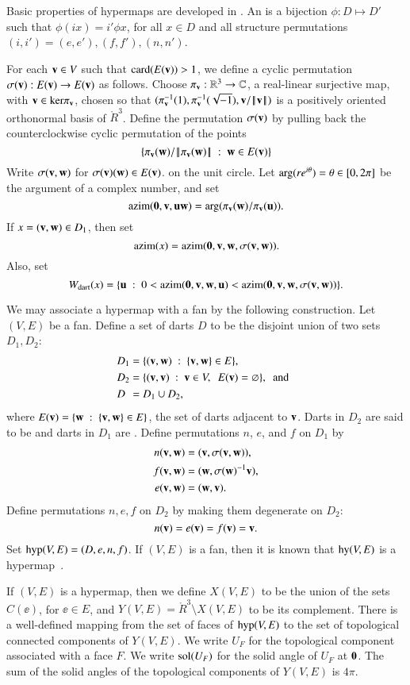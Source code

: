 \documentclass{llncs}
\def\op#1{{\hbox{#1}}}
\begin{document}
Basic properties of hypermaps are developed in \cite[Ch.~4]{DSP}.  An
 is a bijection $\phi:D\mapsto D'$
such that $\phi(i x) = i'\phi x$, for all $x\in D$ and all structure
permutations $(i,i')=(e,e'),(f,f'),(n,n')$.


For each ${\mathbf v}\in V$ such that $\card(E(\v))>1$, we define a cyclic
permutation $\sigma({\mathbf v}):E({\mathbf v})\to E({\mathbf v})$ as follows.  Choose
$\pi_{\mathbf v}:\mathbb{R}^3\to\mathbb{C}$, a real-linear surjective map, with
$\v\in \op{ker}\pi_\v$, chosen so that
$(\pi^{-1}_{\mathbf v}(1),\pi^{-1}_{\mathbf v}(\sqrt{-1}),{\mathbf v}/{\hbox{\ensuremath{\hspace{0.1em}|\hspace{-0.1em}|\hspace{0.1em}}}{\mathbf v}\hbox{\ensuremath{\hspace{0.1em}|\hspace{-0.1em}|\hspace{0.1em}}}})$ is a
positively oriented orthonormal basis of $\ring{R}^3$.  Define the
permutation $\sigma({\mathbf v})$ by pulling back the counterclockwise cyclic
permutation of the points
\[
\{\pi_{\mathbf v}({\mathbf w})/{\hbox{\ensuremath{\hspace{0.1em}|\hspace{-0.1em}|\hspace{0.1em}}}\pi_{\mathbf v}({\mathbf w})\hbox{\ensuremath{\hspace{0.1em}|\hspace{-0.1em}|\hspace{0.1em}}}} \ :\  {\mathbf w}\in E({\mathbf v})\}
\]
Write $\sigma({\mathbf v},{\mathbf w})$ for $\sigma({\mathbf v})({\mathbf w})\in E({\mathbf v})$.  on the unit
circle.  Let $\op{arg}(r e^{i\theta}) =\theta\in[0,2\pi]$ be the
argument of a complex number, and set
\[
\op{azim}(\orz,\v,\u\w) = \op{arg}(\pi_\v(\w)/\pi_\v(\u)).
\]
If $x=({\mathbf v},{\mathbf w})\in D_1$, then set 
\[
 \op{azim}(x) = \op{azim}(\orz,\v,\w,\sigma(\v,\w)).
\]
Also, set
\[
 \Wdart(x) = \{\u \mid 0 < 
 \azim(\orz,\v,\w,\u) < \azim(\orz,\v,\w,\sigma(\v,\w)) \}.
\]

We may associate a hypermap with a fan by the following
construction.  Let $(V,E)$ be a fan.  Define a set of darts $D$ to be
the disjoint union of two sets $D_1,D_2$:
\begin{align*}
D_1 &= \{({\mathbf v},{\mathbf w})\ :\  \{{\mathbf v},{\mathbf w}\}\in E\},\\
D_2 &= \{({\mathbf v},{\mathbf v}) \ :\  {\mathbf v}\in V,\ \ E({\mathbf v}) = \varnothing\},\text{ \ and \ } \\
D\phantom{_2}   &= D_1\cup D_2,
\end{align*}
where $E({\mathbf v})=\{{\mathbf w} \ :\  \{{\mathbf v},{\mathbf w}\}\in E\}$, the set of darts adjacent to ${\mathbf v}$.
Darts in $D_2$ are said to be  and darts in
$D_1$ are .
%
Define permutations $n$, $e$, and $f$ on $D_1$ by
\begin{align*}n({\mathbf v},{\mathbf w}) &= ({\mathbf v},\sigma({\mathbf v},{\mathbf w})),\\
f ({\mathbf v},{\mathbf w}) &= ({\mathbf w},\sigma({\mathbf w})^{-1} {\mathbf v}),\\
e ({\mathbf v},{\mathbf w}) &= ({\mathbf w},{\mathbf v}).
\end{align*}
Define permutations $n,e,f$ on $D_2$ by making them degenerate on $D_2$:
\[ 
n ({\mathbf v}) = e({\mathbf v}) = f({\mathbf v}) = {\mathbf v}.
\] 
Set %
$\op{hyp}(V,E)=(D,e,n,f)$. 
If $(V,E)$ is a fan, 
then it is known that $\op{hy}(V,E)$ is a hypermap~\cite{DSP}.


If $(V,E)$ is a hypermap, then we
define $X(V,E)$ to be the union of the sets $C(\ee)$, for $\ee\in E$,
and $Y(V,E) = \ring{R}^3 \setminus X(V,E)$ to be its complement.  There is
a well-defined mapping from the set of faces of $\op{hyp}(V,E)$ to the set of 
topological
connected components of $Y(V,E)$.  We write $U_F$ for the topological
component associated with a face $F$.  We write $\op{sol}(U_F)$ for the solid
angle of $U_F$ at ${\mathbf 0}$.  The sum of the solid angles of the topological components
of $Y(V,E)$ is $4\pi$.
\end{document}
